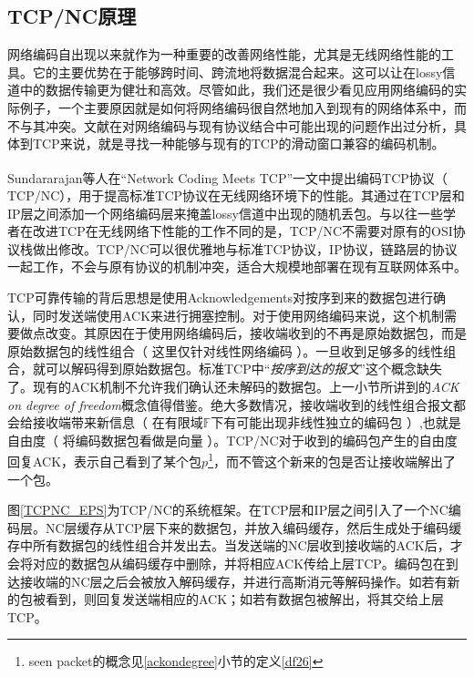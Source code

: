 \subsection{TCP/NC原理}
\par
网络编码自出现以来就作为一种重要的改善网络性能，尤其是无线网络性能的工具。它的主要优势在于能够跨时间、跨流地将数据混合起来。这可以让在lossy信道中的数据传输更为健壮和高效。尽管如此，我们还是很少看见应用网络编码的实际例子，一个主要原因就是如何将网络编码很自然地加入到现有的网络体系中，而不与其冲突。文献\cite{4298308}在对网络编码与现有协议结合中可能出现的问题作出过分析，具体到TCP来说，就是寻找一种能够与现有的TCP的滑动窗口兼容的编码机制。
\par
Sundararajan等人在“Network Coding Meets TCP”\textsuperscript{\cite{Sundararajan2009}}一文中提出编码TCP协议（ TCP/NC），用于提高标准TCP协议在无线网络环境下的性能。其通过在TCP层和IP层之间添加一个网络编码层来掩盖lossy信道中出现的随机丢包。与以往一些学者在改进TCP在无线网络下性能的工作不同的是，TCP/NC不需要对原有的OSI协议栈做出修改。TCP/NC可以很优雅地与标准TCP协议，IP协议，链路层的协议一起工作，不会与原有协议的机制冲突，适合大规模地部署在现有互联网体系中。
\par
TCP可靠传输的背后思想是使用Acknowledgements对按序到来的数据包进行确认，同时发送端使用ACK来进行拥塞控制。对于使用网络编码来说，这个机制需要做点改变。其原因在于使用网络编码后，接收端收到的不再是原始数据包，而是原始数据包的线性组合（ 这里仅针对线性网络编码 ）。一旦收到足够多的线性组合，就可以解码得到原始数据包。标准TCP中“\emph{按序到达的报文}”这个概念缺失了。现有的ACK机制不允许我们确认还未解码的数据包。上一小节所讲到的\emph{ACK on degree of freedom}概念值得借鉴。绝大多数情况，接收端收到的线性组合报文都会给接收端带来新信息（ 在有限域$\mathbb{F}$下有可能出现非线性独立的编码包 ）,也就是自由度（ 将编码数据包看做是向量 ）。TCP/NC对于收到的编码包产生的自由度回复ACK，表示自己看到了某个包$p$\footnote{seen packet的概念见\ref{ackondegree}小节的定义\ref{df26}}，而不管这个新来的包是否让接收端解出了一个包。
\par
图\ref{TCPNC_EPS}为TCP/NC的系统框架。在TCP层和IP层之间引入了一个NC编码层。NC层缓存从TCP层下来的数据包，并放入编码缓存，然后生成处于编码缓存中所有数据包的线性组合并发出去。当发送端的NC层收到接收端的ACK后，才会将对应的数据包从编码缓存中删除，并将相应ACK传给上层TCP。编码包在到达接收端的NC层之后会被放入解码缓存，并进行高斯消元等解码操作。如若有新的包被看到，则回复发送端相应的ACK；如若有数据包被解出，将其交给上层TCP。
